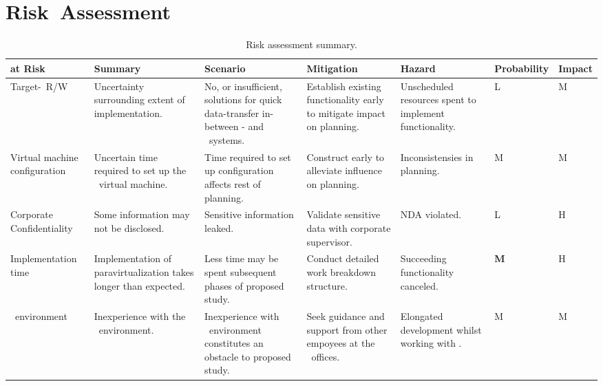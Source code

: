 \section{Risk~Assessment}
\label{sec:risksandliabilities_riskassessment}
\begin{sidewaystable}[h]
\begin{tabular*}{0.75\textwidth}{p{2.8cm}|p{2.8cm}|p{2.8cm}|p{2.8cm}|p{2.8cm}|p{2.2cm}|p{2.2cm}} %
	\textbf{at Risk}				& \textbf{Summary}														& \textbf{Scenario}                   																		& \textbf{Mitigation}        												& \textbf{Hazard}												& \textbf{Probability}	& \textbf{Impact}	\\ \hline
	Target-\termhost\ R/W			& Uncertainty surrounding extent of implementation. 					& No, or insufficient, solutions for quick data-transfer in-between \termhost - and \termtarget\ systems.	& Establish existing functionality early to mitigate impact on planning.	& Unscheduled resources spent to implement functionality.		& L 					& M					\\ \hline
	Virtual machine configuration	& Uncertain time required to set up the \termandroid\ virtual machine. 	& Time required to set up configuration affects rest of planning.											& Construct early to alleviate influence on planning.						& Inconsistensies in planning.									& M 					& M					\\ \hline
	Corporate Confidentiality		& Some information may not be disclosed.								& Sensitive information leaked.																				& Validate sensitive data with corporate supervisor.						& NDA violated. 												& L 					& H					\\ \hline
	Implementation time				& Implementation of paravirtualization takes longer than expected.		& Less time may be spent subsequent phases of proposed study.																& Conduct detailed work breakdown structure.								& Succeeding functionality canceled.	& \textbf{M}			& H					\\ \hline
	\termsimics\ environment		& Inexperience with the \termsimics\ environment.						& Inexperience with \termsimics\ environment constitutes an obstacle to proposed study.						& Seek guidance and support from other empoyees at the \termintel\ offices. & Elongated development whilst working with \termsimics .		& M						& M					
\end{tabular*}
\label{tab:risks}
\caption{Risk assessment summary.}
\end{sidewaystable}
